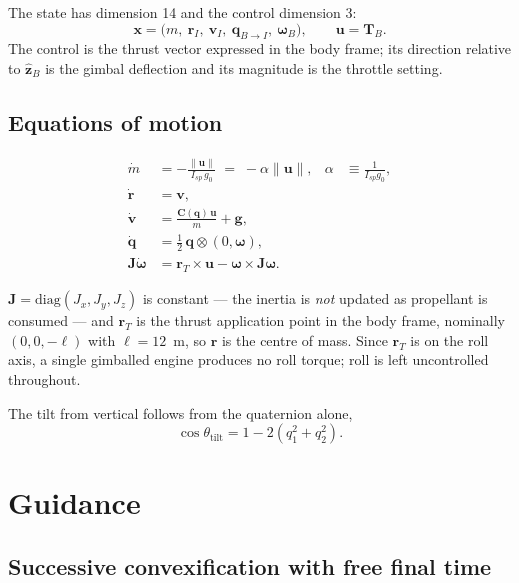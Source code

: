 \documentclass[11pt,a4paper]{article}
\newcommand{\vect}[1]{\mathbf{#1}}
\newcommand{\quat}[1]{\mathbf{#1}}
\newcommand{\Rot}{\vect{C}}
\begin{document}
The state has dimension 14 and the control dimension 3:
\begin{equation}
\vect{x}=\bigl(m,\ \vect{r}_I,\ \vect{v}_I,\ \quat{q}_{B\to I},\ \boldsymbol{\omega}_B\bigr),
\qquad
\vect{u}=\vect{T}_B .
\end{equation}
The control is the thrust vector expressed in the body frame; its direction
relative to $\hat{\vect{z}}_B$ is the gimbal deflection and its magnitude is the
throttle setting.

\subsection{Equations of motion}

\begin{align}
\dot m &= -\frac{\lVert\vect{u}\rVert}{I_{sp}\,g_0} \;=\; -\alpha\lVert\vect{u}\rVert,
  &\alpha &\equiv \frac{1}{I_{sp} g_0}, \label{eq:mdot}\\
\dot{\vect{r}} &= \vect{v}, \label{eq:rdot}\\
\dot{\vect{v}} &= \frac{\Rot(\quat{q})\,\vect{u}}{m} + \vect{g}, \label{eq:vdot}\\
\dot{\quat{q}} &= \tfrac{1}{2}\,\quat{q}\otimes(0,\boldsymbol{\omega}), \label{eq:qdot}\\
\vect{J}\dot{\boldsymbol{\omega}} &= \vect{r}_T\times\vect{u}
  - \boldsymbol{\omega}\times\vect{J}\boldsymbol{\omega}. \label{eq:wdot}
\end{align}

$\vect{J}=\mathrm{diag}(J_x,J_y,J_z)$ is constant --- the inertia is \emph{not}
updated as propellant is consumed --- and $\vect{r}_T$ is the thrust application
point in the body frame, nominally $(0,0,-\ell)$ with $\ell=12$~m, so
$\vect{r}$ is the centre of mass. Since $\vect{r}_T$ is on the roll axis, a
single gimballed engine produces no roll torque; roll is left uncontrolled
throughout.

The tilt from vertical follows from the quaternion alone,
\begin{equation}
\cos\theta_{\mathrm{tilt}} = 1-2\left(q_1^2+q_2^2\right).
\label{eq:tilt}
\end{equation}

\section{Guidance}
\label{sec:guidance}

\subsection{Successive convexification with free final time}
\end{document}
